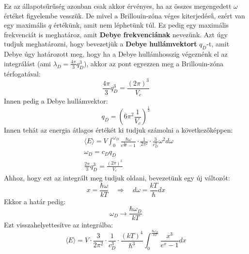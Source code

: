 \documentclass[../main.tex]{subfiles}
\begin{document}
Ez az állapotsűrűség azonban csak akkor érvényes, ha az összes megengedett $\omega$ értéket figyelembe vesszük. De mivel a Brillouin-zóna véges kiterjedésű, ezért van egy maximális $q$ értékünk, amit nem léphetünk túl. Ez pedig egy maximális frekvenciát is meghatároz, amit \textbf{Debye frekvenciának} nevezünk.
Azt úgy tudjuk meghatározni, hogy bevezetjük a \textbf{Debye hullámvektort} $q_D$-t, amit Debye úgy határozott meg, hogy ha a Debye hullámhosszig végeznénk el az integrálást (ami $\lambda_D = \frac{4\pi}{3} q_D^3$), akkor az pont egyezzen meg a Brillouin-zóna térfogatával:
\begin{equation}
    \frac{4\pi}{3} q_D^3 = \frac{(2 \pi)^3}{V_c}
\end{equation}
Innen pedig a Debye hullámvektor:
\begin{equation}
    q_D = \left(6 \pi^2 \frac{1}{V_c}\right)^{\frac{1}{3}}
\end{equation}
Innen tehát az energia átlagos értékét ki tudjuk számolni a következőképpen:
\begin{equation}
    \boxed{
    \begin{aligned}
        &\langle E \rangle = V \int_0^{\omega_D} \frac{\hbar \omega}{e^{\frac{\hbar \omega}{k T}} - 1} \cdot \frac{1}{2 \pi^2} \cdot \frac{3}{c_D^3} \omega^2 d\omega \\
        &\omega_D = c_D q_D \\
        &\frac{2\pi}{3} q_D^3 = \frac{(2 \pi)^3}{V_c}
    \end{aligned}}
\end{equation}
Ahhoz, hogy ezt az integrált meg tudjuk oldani, bevezetünk egy új változót:
\begin{equation}
    x = \frac{\hbar \omega}{k T} \quad \Rightarrow \quad d\omega = \frac{k T}{\hbar} dx
\end{equation}
Ekkor a határ pedig:
\begin{equation}
    \omega_D \to \frac{\hbar \omega_D}{k T}
\end{equation}
Ezt visszahelyettesítve az integrálba:
\begin{equation}
    \langle E \rangle = V \cdot \frac{3}{2 \pi^2} \cdot \frac{1}{c_D^3} \cdot \frac{(k T)^4}{\hbar^3} \int_0^{\frac{\hbar \omega_D}{k T}} \frac{x^3}{e^x - 1} dx
\end{equation}
\end{document}
